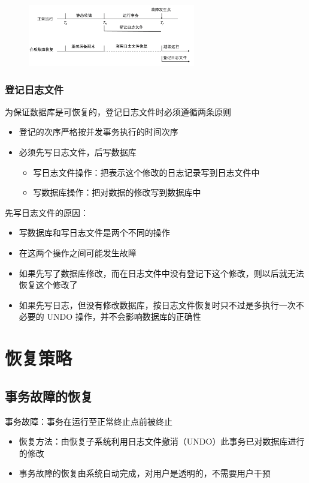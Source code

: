 \begin{figure}[H]
    \vspace{-0.5em}
	\centering
	\includegraphics[width=0.65\textwidth]{images/10.2}
    \vspace{-1em}
\end{figure}

\subsubsection{登记日志文件}
为保证数据库是可恢复的，登记日志文件时必须遵循两条原则
\begin{itemize}
    \item 登记的次序严格按并发事务执行的时间次序
    \item 必须先写日志文件，后写数据库
    \begin{itemize}
        \item 写日志文件操作：把表示这个修改的日志记录写到日志文件中
        \item 写数据库操作：把对数据的修改写到数据库中
    \end{itemize}
\end{itemize}

先写日志文件的原因：
\begin{itemize}
    \item 写数据库和写日志文件是两个不同的操作
    \item 在这两个操作之间可能发生故障
    \item 如果先写了数据库修改，而在日志文件中没有登记下这个修改，则以后就无法恢复这个修改了
    \item 如果先写日志，但没有修改数据库，按日志文件恢复时只不过是多执行一次不必要的 UNDO 操作，并不会影响数据库的正确性
\end{itemize}

\section{恢复策略}

\subsection{事务故障的恢复}
事务故障：事务在运行至正常终止点前被终止
\begin{itemize}
    \item 恢复方法：由恢复子系统利用日志文件撤消（UNDO）此事务已对数据库进行的修改
    \item 事务故障的恢复由系统自动完成，对用户是透明的，不需要用户干预
\end{itemize}

